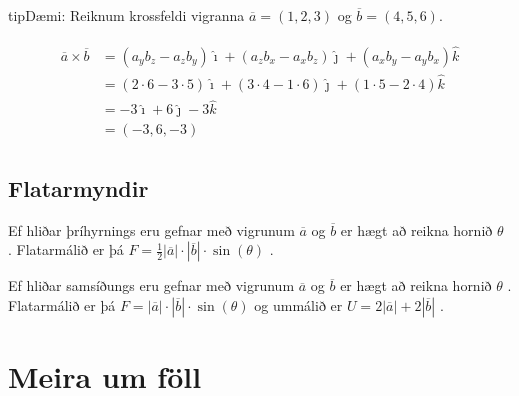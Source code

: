 \documentclass[a4paper,10pt,icelandic]{sphinxmanual}
\begin{document}
\begin{sphinxadmonition}{tip}{Dæmi:}
Reiknum krossfeldi vigranna \(\overline{a}=(1,2,3)\) og \(\overline{b}=(4,5,6)\).

\begin{equation*}
\begin{split}\begin{aligned}
  \overline{a} \times \overline{b} &= (a_y b_z - a_z b_y)\hat{\imath} + (a_z b_x - a_x b_z)\hat{\jmath} + (a_x b_y - a_y b_x)\hat{k} \\
  &= (2\cdot 6-3\cdot 5)\hat{\imath} + (3\cdot 4 - 1 \cdot 6) \hat{\jmath} + ( 1\cdot 5 - 2\cdot 4) \hat{k}\\
  &= -3 \hat{\imath} +6 \hat{\jmath} - 3\hat{k}\\
  &= (-3,6,-3)
\end{aligned}\end{split}
\end{equation*}\end{sphinxadmonition}


\section{Flatarmyndir}
\label{\detokenize{Kafli08:flatarmyndir}}
Ef hliðar þríhyrnings eru gefnar með vigrunum \(\overline{a}\) og \(\overline{b}\) er hægt að reikna hornið \(\theta\) .
Flatarmálið er þá \(F=\frac{1}{2}|\overline{a}| \cdot |\overline{b}| \cdot \sin(\theta)\) .

\begin{figure}[htbp]
\centering

\noindent{}
\end{figure}

Ef hliðar samsíðungs eru gefnar með vigrunum \(\overline{a}\) og \(\overline{b}\) er hægt að reikna hornið \(\theta\) .
Flatarmálið er þá \(F=|\overline{a}| \cdot |\overline{b}| \cdot \sin(\theta)\) og ummálið er \(U=2|\overline{a}|+2|\overline{b}|\) .

\begin{figure}[htbp]
\centering

\noindent{}
\end{figure}


\chapter{Meira um föll}
\label{\detokenize{Kafli09:meira-um-foll}}\label{\detokenize{Kafli09:s-meiraumfoll}}\label{\detokenize{Kafli09::doc}}
\end{document}
